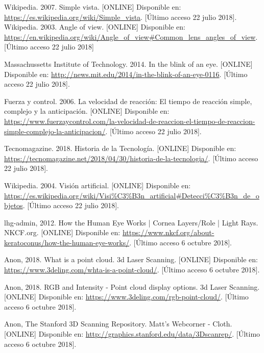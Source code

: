 \begin{thebibliography}{99}
 Wikipedia. 2007. Simple vista. [ONLINE] Disponible en: \url{https://es.wikipedia.org/wiki/Simple_vista}. [Último acceso 22 julio 2018].
 Wikipedia. 2003. Angle of view. [ONLINE] Disponible en: \url{https://en.wikipedia.org/wiki/Angle_of_view#Common_lens_angles_of_view}. [Último acceso 22 julio 2018]

 Massachussetts Institute of Technology. 2014. In the blink of an eye. [ONLINE] Disponible en: \url{http://news.mit.edu/2014/in-the-blink-of-an-eye-0116}. [Último acceso 22 julio 2018].

 Fuerza y control. 2006. La velocidad de reacción: El tiempo de reacción simple, complejo y la anticipación. [ONLINE] Disponible en: \url{https://www.fuerzaycontrol.com/la-velocidad-de-reaccion-el-tiempo-de-reaccion-simple-complejo-la-anticipacion/}. [Último acceso 22 julio 2018].

 Tecnomagazine. 2018. Historia de la Tecnología. [ONLINE] Disponible en: \url{https://tecnomagazine.net/2018/04/30/historia-de-la-tecnologia/}. [Último acceso 22 julio 2018].

 Wikipedia. 2004. Visión artificial. [ONLINE] Disponible en: \url{https://es.wikipedia.org/wiki/Visi%C3%B3n_artificial#Detecci%C3%B3n_de_objetos}. [Último acceso 22 julio 2018].

 lhg-admin, 2012. How the Human Eye Works | Cornea Layers/Role | Light Rays. NKCF.org. [ONLINE] Disponible en: \url{https://www.nkcf.org/about-keratoconus/how-the-human-eye-works/}. [Último acceso 6 octubre 2018].


 Anon, 2018. What is a point cloud. 3d Laser Scanning. [ONLINE] Disponible en: \url{https://www.3deling.com/whta-is-a-point-cloud/}. [Último acceso 6 octubre 2018].


 Anon, 2018. RGB and Intensity - Point cloud display options. 3d Laser Scanning. [ONLINE] Disponible en: \url{https://www.3deling.com/rgb-point-cloud/}. [Último acceso 6 octubre 2018].

 

 Anon, The Stanford 3D Scanning Repository. Matt's Webcorner - Cloth. [ONLINE] Disponible en: \url{http://graphics.stanford.edu/data/3Dscanrep/}. [Último acceso 6 octubre 2018].



\end{thebibliography}
